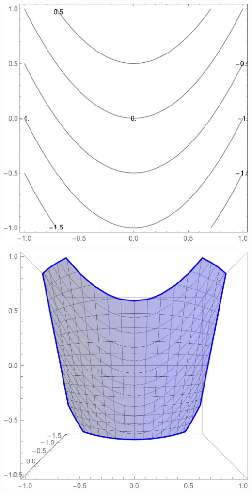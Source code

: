 \documentclass[a4paper, 12pt]{article}
\begin{document}
	\begin{minipage}{.5\linewidth}
		\includegraphics[scale=.25]{images/ContourLabels}
	\end{minipage}
	\begin{minipage}{.5\linewidth}
		\includegraphics[scale=.25]{images/Top3dContours}
	\end{minipage}
\end{document}

